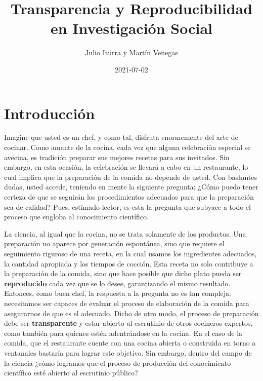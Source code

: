 \documentclass[
]{book}
\title{Transparencia y Reproducibilidad en Investigación Social}
\author{Julio Iturra y Martín Venegas}
\date{2021-07-02}
\begin{document}
\maketitle

{
\setcounter{tocdepth}{1}
\tableofcontents
}
\hypertarget{intro}{%
\chapter{Introducción}\label{intro}}

Imagine que usted es un chef, y como tal, disfruta enormemente del arte de cocinar. Como amante de la cocina, cada vez que alguna celebración especial se avecina, es tradición preparar sus mejores recetas para sus invitados. Sin embargo, en esta ocasión, la celebración se llevará a cabo en un restaurante, lo cual implica que la preparación de la comida no depende de usted. Con bastantes dudas, usted accede, teniendo en mente la siguiente pregunta: ¿Cómo puedo tener certeza de que se seguirán los procedimientos adecuados para que la preparación sea de calidad? Pues, estimado lector, es esta la pregunta que subyace a todo el proceso que engloba al conocimiento científico.

La ciencia, al igual que la cocina, no se trata solamente de los productos. Una preparación no aparece por generación espontánea, sino que requiere el seguimiento riguroso de una receta, en la cual usamos los ingredientes adecuados, la cantidad apropiada y los tiempos de cocción. Esta receta no solo contribuye a la preparación de la comida, sino que hace posible que dicho plato pueda ser \textbf{reproducido} cada vez que se lo desee, garantizando el mismo resultado. Entonces, como buen chef, la respuesta a la pregunta no es tan compleja: necesitamos ser capaces de evaluar el proceso de elaboración de la comida para asegurarnos de que es el adecuado. Dicho de otro modo, el proceso de preparación debe ser \textbf{transparente} y estar abierto al escrutinio de otros cocineros expertos, como también para quienes estén adentrándose en la cocina. En el caso de la comida, que el restaurante cuente con una cocina abierta o construida en torno a ventanales bastaría para lograr este objetivo. Sin embargo, dentro del campo de la ciencia ¿cómo logramos que el proceso de producción del conocimiento científico esté abierto al escrutinio público?
\end{document}

